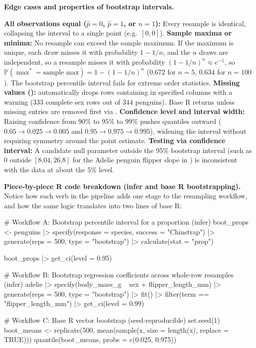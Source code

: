 \documentclass[10pt]{scrartcl}
\begin{document}
\noindent\textbf{Edge cases and properties of bootstrap intervals.}
\begin{itemize}
  \ii \textbf{All observations equal ($\hat p = 0$, $\hat p = 1$, or $n = 1$):} Every resample is identical, collapsing the interval to a single point (e.g.\ $[0,0]$).
  \ii \textbf{Sample maxima or minima:} No resample can exceed the sample maximum. If the maximum is unique, each draw misses it with probability $1 - 1/n$, and the $n$ draws are independent, so a resample misses it with probability $(1 - 1/n)^n \approx e^{-1}$, so $\mathbb P(\max^* = \text{sample max}) = 1 - (1 - 1/n)^n$ ($0.672$ for $n=5$, $0.634$ for $n=100$). The bootstrap percentile interval fails for extreme order statistics.
  \ii \textbf{Missing values ():}  automatically drops rows containing  in specified columns with a warning ($333$ complete sex rows out of $344$ penguins). Base R  returns  unless missing entries are removed first via .
  \ii \textbf{Confidence level and interval width:} Raising confidence from $90\%$ to $95\%$ to $99\%$ pushes quantiles outward ($0.05\to 0.025\to 0.005$ and $0.95\to 0.975\to 0.995$), widening the interval without requiring symmetry around the point estimate.
  \ii \textbf{Testing via confidence interval:} A candidate null parameter outside the $95\%$ bootstrap interval (such as $0$ outside $[8.04, 26.8]$ for the Adelie penguin flipper slope in ) is inconsistent with the data at about the $5\%$ level.
\end{itemize}

\medskip\noindent\textbf{Piece-by-piece R code breakdown (infer and base R bootstrapping).} Notice how each verb in the  pipeline adds one stage to the resampling workflow, and how the same logic translates into two lines of base R:

\begin{rcode}
# Workflow A: Bootstrap percentile interval for a proportion (infer)
boot_props <- penguins |>
  specify(response = species, success = "Chinstrap") |>
  generate(reps = 500, type = "bootstrap") |>
  calculate(stat = "prop")

boot_props |> get_ci(level = 0.95)

# Workflow B: Bootstrap regression coefficients across whole-row resamples (infer)
adelie |>
  specify(body_mass_g ~ sex + flipper_length_mm) |>
  generate(reps = 500, type = "bootstrap") |>
  fit() |>
  filter(term == "flipper_length_mm") |>
  get_ci(level = 0.99)

# Workflow C: Base R vector bootstrap (seed-reproducible)
set.seed(1)
boot_means <- replicate(500, mean(sample(x, size = length(x), replace = TRUE)))
quantile(boot_means, probs = c(0.025, 0.975))
\end{rcode}
\end{document}
